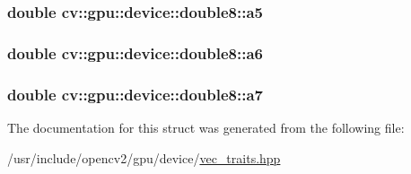 \hypertarget{structcv_1_1gpu_1_1device_1_1double8_a2d7d285245ec262d271af75e9b76e9b1}{
\subsubsection[{a5}]{\setlength{\rightskip}{0pt plus 5cm}double cv\-::gpu\-::device\-::double8\-::a5}}\label{structcv_1_1gpu_1_1device_1_1double8_a2d7d285245ec262d271af75e9b76e9b1}
\hypertarget{structcv_1_1gpu_1_1device_1_1double8_a92362f9376ee46b3fff7c11ecc1bd4ed}{
\subsubsection[{a6}]{\setlength{\rightskip}{0pt plus 5cm}double cv\-::gpu\-::device\-::double8\-::a6}}\label{structcv_1_1gpu_1_1device_1_1double8_a92362f9376ee46b3fff7c11ecc1bd4ed}
\hypertarget{structcv_1_1gpu_1_1device_1_1double8_acda70907989f0200d91fd5c7bcef05e5}{
\subsubsection[{a7}]{\setlength{\rightskip}{0pt plus 5cm}double cv\-::gpu\-::device\-::double8\-::a7}}\label{structcv_1_1gpu_1_1device_1_1double8_acda70907989f0200d91fd5c7bcef05e5}


The documentation for this struct was generated from the following file\-:\begin{DoxyCompactItemize}
\item 
/usr/include/opencv2/gpu/device/\hyperlink{vec__traits_8hpp}{vec\-\_\-traits.\-hpp}\end{DoxyCompactItemize}
